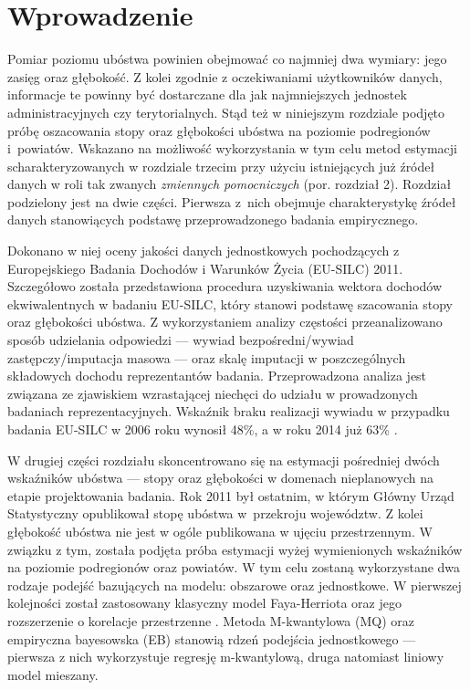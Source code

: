 \section{Wprowadzenie}

Pomiar poziomu ubóstwa powinien obejmować co najmniej dwa wymiary: jego zasięg oraz głębokość. Z kolei zgodnie z oczekiwaniami użytkowników danych, informacje te powinny być dostarczane dla jak najmniejszych jednostek administracyjnych czy terytorialnych. Stąd też w niniejszym rozdziale podjęto próbę oszacowania stopy oraz głębokości ubóstwa na poziomie podregionów i~powiatów. Wskazano na możliwość wykorzystania w tym celu  metod estymacji scharakteryzowanych w rozdziale trzecim przy użyciu istniejących już źródeł danych w roli tak zwanych \textit{zmiennych pomocniczych} (por. rozdział 2). Rozdział podzielony jest na dwie części. Pierwsza z~nich obejmuje charakterystykę źródeł danych stanowiących podstawę przeprowadzonego badania empirycznego.

Dokonano w niej oceny jakości danych jednostkowych pochodzących z Europejskiego Badania Dochodów i Warunków Życia (EU-SILC) 2011. Szczegółowo została przedstawiona procedura uzyskiwania wektora dochodów ekwiwalentnych w badaniu EU-SILC, który stanowi podstawę szacowania stopy oraz głębokości ubóstwa. Z wykorzystaniem analizy częstości przeanalizowano sposób udzielania odpowiedzi --- wywiad bezpośredni/wywiad zastępczy/imputacja masowa --- oraz skalę imputacji w poszczególnych składowych dochodu reprezentantów badania. Przeprowadzona analiza jest związana ze zjawiskiem wzrastającej niechęci do udziału w prowadzonych badaniach reprezentacyjnych. Wskaźnik braku realizacji wywiadu w przypadku badania EU-SILC w 2006 roku wynosił 48\%, a w roku 2014 już 63\% \citep{dezagregacja2015}.

W drugiej części rozdziału skoncentrowano się na estymacji pośredniej dwóch wskaźników ubóstwa --- stopy oraz głębokości w domenach nieplanowych na etapie projektowania badania. Rok 2011 był ostatnim, w którym Główny Urząd Statystyczny opublikował stopę ubóstwa w~przekroju województw. Z kolei głębokość ubóstwa nie jest w ogóle publikowana w ujęciu przestrzennym. W związku z tym, została podjęta próba estymacji wyżej wymienionych wskaźników na poziomie podregionów oraz powiatów. W tym celu zostaną wykorzystane dwa rodzaje podejść bazujących na modelu: obszarowe oraz jednostkowe. W pierwszej kolejności został zastosowany klasyczny model Faya-Herriota \citep{fh1979} oraz jego rozszerzenie o korelacje przestrzenne \citep{pratesi2008}. Metoda M-kwantylowa (MQ) \citep{mq2006} oraz empiryczna bayesowska (EB) \citep{ebp2010} stanowią rdzeń podejścia jednostkowego --- pierwsza z nich wykorzystuje regresję m-kwantylową, druga natomiast liniowy model mieszany. 

